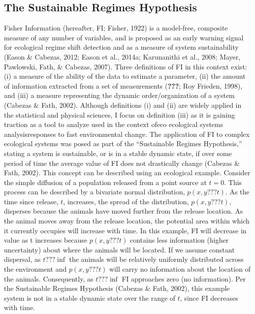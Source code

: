 \documentclass[12pt,twoside,openany]{reedthesis}
\begin{document}
\hypertarget{the-sustainable-regimes-hypothesis}{%
\subsection{The Sustainable Regimes Hypothesis}\label{the-sustainable-regimes-hypothesis}}

Fisher Information (hereafter, FI; Fisher, 1922) is a model-free, composite measure of any number of variables, and is proposed as an early warning signal for ecological regime shift detection and as a measure of system sustainability (Eason \& Cabezas, 2012; Eason et al., 2014a; Karunanithi et al., 2008; Mayer, Pawlowski, Fath, \& Cabezas, 2007). Three definitions of FI in this context exist: (i) a measure of the ability of the data to estimate a parameter, (ii) the amount of information extracted from a set of measurements ({\textbf{???}}; Roy Frieden, 1998), and (iii) a measure representing the dynamic order/organization of a system (Cabezas \& Fath, 2002). Although definitions (i) and (ii) are widely applied in the statistical and physical sciences, I focus on definition (iii) as it is gaining traction as a tool to analyze used in the context ofeco ecological systems analysisresponses to fast environmental change. The application of FI to complex ecological systems was posed as part of the ``Sustainable Regimes Hypothesis,'' stating a system is sustainable, or is in a stable dynamic state, if over some period of time the average value of FI does not drastically change (Cabezas \& Fath, 2002). This concept can be described using an ecological example. Consider the simple diffusion of a population released from a point source at \(t=0\). This process can be described by a bivariate normal distribution, \(p(x,y???t)\). As the time since release, \(t\), increases, the spread of the distribution, \(p(x,y???t)\), disperses because the animals have moved further from the release location. As the animal moves away from the release location, the potential area within which it currently occupies will increase with time. In this example, FI will decrease in value as t increases because \(p(x,y???t)\) contains less information (higher uncertainty) about where the animals will be located. If we assume constant dispersal, as \(t???\inf\) the animals will be relatively uniformly distributed across the environment and \(p(x,y???t)\) will carry no information about the location of the animals. Consequently, as \(t???\inf\) FI approaches zero (no information). Per the Sustainable Regimes Hypothesis (Cabezas \& Fath, 2002), this example system is not in a stable dynamic state over the range of \(t\), since FI decreases with time.
\end{document}
